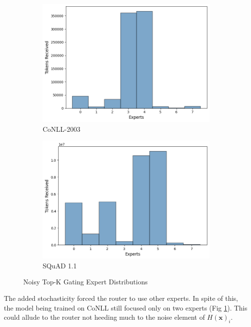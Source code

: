\documentclass[12pt]{article}
\begin{document}
\begin{figure}[h]
\centering
\begin{subfigure}{.5\textwidth}
  \centering
  \includegraphics[width=1\linewidth]{report_images/conll/noisy_top_k.png}
  \caption{CoNLL-2003}
  \label{fig:noisy_conll}
\end{subfigure}%
\begin{subfigure}{.5\textwidth}
  \centering
  \includegraphics[width=1\linewidth]{report_images/squad/noisy_top_k.png}
  \caption{SQuAD 1.1}
  \label{fig:noisy_squad}
\end{subfigure}
\caption{Noisy Top-K Gating Expert Distributions}
\label{fig:noisy}
\end{figure}
\FloatBarrier
\noindent
The added stochasticity forced the router to use other experts. In spite of this, the model being trained on CoNLL still focused only on two experts (Fig \ref{fig:noisy_conll}). This could allude to the router not heeding much to the noise element of $H(\mathbf{x})_i$. 
\end{document}
